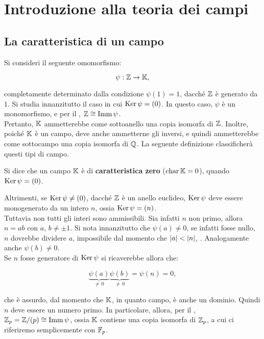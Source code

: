 \chapter{Introduzione alla teoria dei campi}

\section{La caratteristica di un campo}

Si consideri il seguente omomorfismo:

\[ \psi : \mathbb Z \to \mathbb{K}, \]

\vskip 0.1in

completamente determinato dalla condizione $\psi(1) = 1$, dacché
$\mathbb Z$ è generato da $1$. Si studia innanzitutto il caso in cui
$\operatorname{Ker} \psi = (0)$. In questo caso, $\psi$ è un monomorfismo, e per
il , $\mathbb Z \cong \operatorname{Imm} \psi$. \\

Pertanto, $\mathbb{K}$ ammetterebbe come sottoanello una copia isomorfa di $\mathbb Z$.
Inoltre, poiché $\mathbb{K}$ è un campo, deve anche ammetterne gli inversi, e quindi
ammetterebbe come sottocampo una copia isomorfa di $\mathbb Q$. La seguente
definizione classificherà questi tipi di campo. \\

\begin{definition}
    Si dice che un campo $\mathbb{K}$ è di \textbf{caratteristica zero} ($\operatorname{char} \mathbb{K} = 0$),
    quando $\operatorname{Ker} \psi = (0)$.
\end{definition}

Altrimenti, se $\operatorname{Ker} \psi \neq (0)$, dacché $\mathbb Z$ è un anello euclideo,
$\operatorname{Ker} \psi$ deve essere monogenerato da un intero $n$, ossia $\operatorname{Ker} \psi = (n)$. \\

Tuttavia non tutti gli interi sono ammissibili. Sia infatti $n$ non primo, allora
$n = ab$ con $a$, $b \neq \pm 1$. Si nota innanzitutto che $\psi(a) \neq 0$,
se infatti fosse nullo, $n$ dovrebbe dividere $a$, impossibile dal momento
che $\left|a\right| < \left|n\right|$, \Lightning{}. Analogamente anche $\psi(b) \neq 0$. \\

Se $n$ fosse generatore di $\operatorname{Ker} \psi$ si ricaverebbe allora che:

\[ \underbrace{\psi(a)}_{\neq\,0} \underbrace{\psi(b)}_{\neq\,0} = \psi(n) = 0, \]

\vskip 0.1in

che è assurdo, dal momento che $\mathbb{K}$, in quanto campo, è anche un dominio.
Quindi $n$ deve essere un numero primo. In particolare, allora, per
il , $\mathbb{Z}_p = \mathbb Z/(p) \cong \operatorname{Imm} \psi$,
ossia $\mathbb{K}$ contiene una copia isomorfa di $\mathbb{Z}_p$, a cui ci riferiremo
semplicemente con $\mathbb{F}_p$. \\

